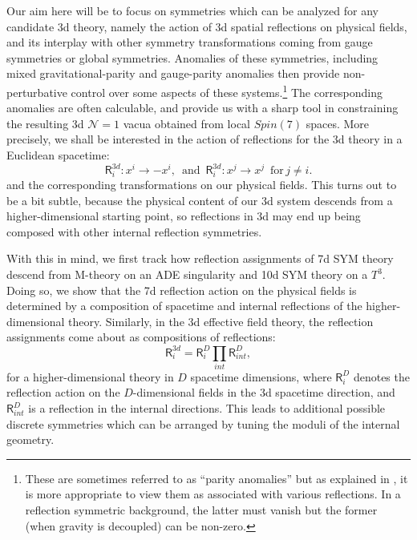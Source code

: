 \documentclass[12pt]{article}%
\numberwithin{equation}{section}
\renewcommand{\(}{\left(}
\renewcommand{\)}{\right)}
\renewcommand{\[}{\left[}
\renewcommand{\]}{\right]}
\begin{document}
Our aim here will be to focus on symmetries which can be analyzed
for any candidate 3d theory, namely the action of 3d spatial
reflections on physical fields, and its interplay with other
symmetry transformations coming from gauge symmetries or global symmetries.
Anomalies of these symmetries, including mixed gravitational-parity and gauge-parity anomalies
then provide non-perturbative control over some aspects of these systems.\footnote{These
are sometimes referred to as ``parity anomalies'' but as explained in \cite{Witten:2016cio},
it is more appropriate to view them as associated with various reflections.
In a reflection symmetric background, the latter must vanish but the former (when gravity is decoupled) can be non-zero.}
The corresponding anomalies are often calculable, and provide us with a
sharp tool in constraining the resulting 3d $\mathcal{N} = 1$ vacua obtained from local $Spin(7)$ spaces.
More precisely, we shall be interested in the action of reflections for the 3d theory in a
Euclidean spacetime:
\begin{equation}
\mathsf{R}^{3d}_i : x^i \rightarrow -x^i, \,\,\,\text{and} \,\,\, \mathsf{R}^{3d}_i : x^{j} \rightarrow x^{j} \,\,\,\text{for} \, j \neq i.
\end{equation}
and the corresponding transformations on our physical fields. This turns out to be a bit subtle, because
the physical content of our 3d system descends from a higher-dimensional starting point,
so reflections in 3d may end up being composed with other internal reflection symmetries.

With this in mind, we first track how reflection assignments of 7d SYM theory descend from
M-theory on an ADE singularity and 10d SYM theory on a $T^3$. Doing so, we show that the
7d reflection action on the physical fields is determined by a composition of spacetime and internal
reflections of the higher-dimensional theory. Similarly, in the 3d effective field theory,
the reflection assignments come about as compositions of reflections:
\begin{equation}
\mathsf{R}_{i}^{3d} = \mathsf{R}_{i}^{D} \underset{int}{\prod} \mathsf{R}_{int}^{D},
\end{equation}
for a higher-dimensional theory in $D$ spacetime dimensions, where
$\mathsf{R}_{i}^{D}$ denotes the reflection action on the
$D$-dimensional fields in the 3d spacetime direction, and
$\mathsf{R}_{int}^{D}$ is a reflection in the internal directions.
This leads to additional possible discrete symmetries which can
be arranged by tuning the moduli of the internal geometry.
\end{document}
